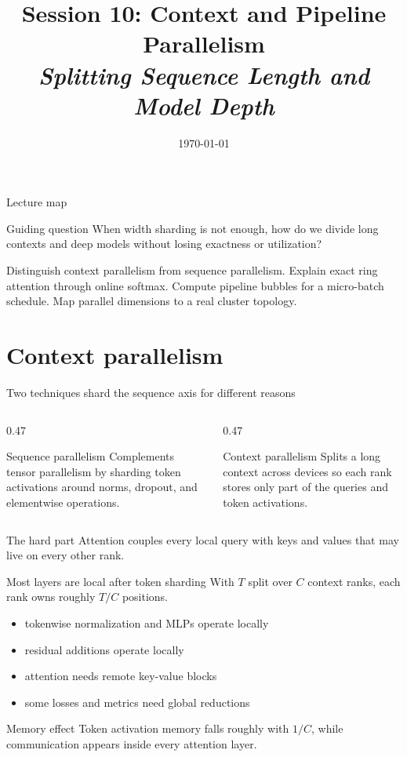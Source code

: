 \documentclass[handout]{beamer}
\title[TLM -- Session 10]{Session 10: Context and Pipeline Parallelism\\[4pt]
\normalsize\itshape Splitting Sequence Length and Model Depth}
\date{\today}
\begin{document}
\makelecturetitle
\begin{frame}{Lecture map}
  \tableofcontents
  \vfill
  \begin{block}{Guiding question}
    When width sharding is not enough, how do we divide long contexts and deep models without losing exactness or utilization?
  \end{block}
\end{frame}
\learninggoals
  {Distinguish context parallelism from sequence parallelism.}
  {Explain exact ring attention through online softmax.}
  {Compute pipeline bubbles for a micro-batch schedule.}
  {Map parallel dimensions to a real cluster topology.}

\section{Context parallelism}

\begin{frame}{Two techniques shard the sequence axis for different reasons}
  \begin{columns}[t]
    \begin{column}{0.47\linewidth}
      \begin{block}{Sequence parallelism}
        Complements tensor parallelism by sharding token activations around norms, dropout, and elementwise operations.
      \end{block}
    \end{column}
    \begin{column}{0.47\linewidth}
      \begin{block}{Context parallelism}
        Splits a long context across devices so each rank stores only part of the queries and token activations.
      \end{block}
    \end{column}
  \end{columns}
  \begin{alertblock}{The hard part}
    Attention couples every local query with keys and values that may live on every other rank.
  \end{alertblock}
\end{frame}

\begin{frame}{Most layers are local after token sharding}
  With $T$ split over $C$ context ranks, each rank owns roughly $T/C$ positions.
  \begin{itemize}
    \setlength{\itemsep}{7pt}
    \item tokenwise normalization and MLPs operate locally
    \item residual additions operate locally
    \item attention needs remote key-value blocks
    \item some losses and metrics need global reductions
  \end{itemize}
  \begin{block}{Memory effect}
    Token activation memory falls roughly with $1/C$, while communication appears inside every attention layer.
  \end{block}
\end{frame}
\end{document}
